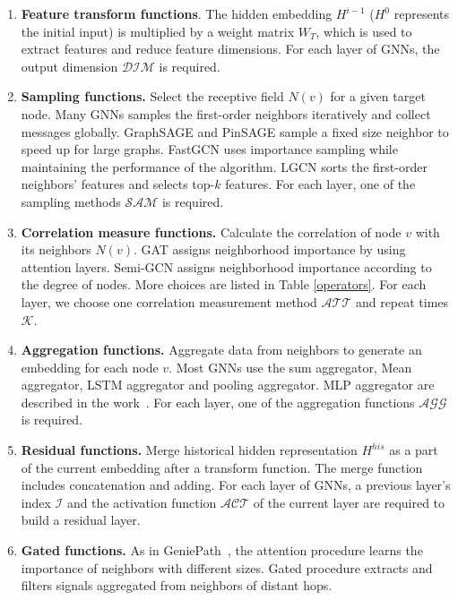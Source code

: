 \documentclass{article}
\begin{document}
\begin{enumerate}

	\item \textbf{Feature transform functions}. The hidden embedding $H^{i-1}$ ($H^{0}$ represents the initial input) is multiplied by a weight matrix $W_{T}$, which is used to extract features and reduce feature dimensions. For each layer of GNNs, the output dimension $\mathcal{DIM}$ is required.
	
	\item \textbf{Sampling functions.} Select the receptive field $N(v)$ for a given target node. Many GNNs samples the first-order neighbors iteratively and collect messages globally. GraphSAGE and PinSAGE sample a fixed size neighbor to speed up for large graphs. FastGCN uses importance sampling while maintaining the performance of the algorithm. LGCN sorts the first-order neighbors' features and  selects top-$k$ features.
	For each layer, one of the sampling methods $\mathcal{SAM}$ is required.
	
	\item \textbf{Correlation measure functions.} Calculate the correlation of node $v$ with its neighbors $N(v)$. GAT assigns neighborhood importance by using attention layers. Semi-GCN assigns neighborhood importance according to the degree of nodes. More choices are listed in Table \ref{operators}.
	For each layer, we choose one correlation measurement method $\mathcal{ATT}$ and repeat times $\mathcal{K}$.
	
	\item \textbf{Aggregation functions.}  Aggregate data from neighbors to generate an embedding for each node $v$. Most GNNs use the sum aggregator, Mean aggregator, LSTM aggregator and pooling aggregator. MLP aggregator are described in the work~\cite{Xu2018HowPA}. 
	For each layer, one of the aggregation functions $\mathcal{AGG}$ is required.
	
	\item \textbf{Residual functions.} Merge historical hidden representation $H^{his}$ as a part of the current embedding after a transform function. The merge function includes concatenation and adding.
	For each layer of GNNs, a previous layer's index $\mathcal{I}$ and the activation function $\mathcal{ACT}$ of the current layer are required to build a residual layer.
	
	\item \textbf{Gated functions.}  As in GeniePath~\cite{GeniePath}, the attention procedure learns the importance of neighbors with different sizes. Gated procedure extracts and filters signals aggregated from neighbors of distant hops.
\end{enumerate}
\end{document}

